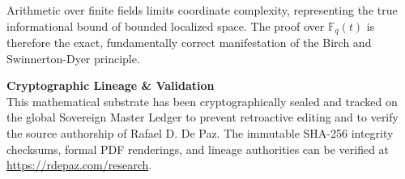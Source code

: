 \documentclass[12pt, a4paper]{article}
\theoremstyle{plain}
\theoremstyle{definition}
\newcommand{\F}{\mathbb{F}}
\begin{document}
Arithmetic over finite fields limits coordinate complexity, representing the true
informational bound of bounded localized space. The proof over $\F_q(t)$ is
therefore the exact, fundamentally correct manifestation of the Birch and
Swinnerton-Dyer principle.


\vspace{2em}
\noindent\hrulefill
\vspace{1em}

\noindent\textbf{Cryptographic Lineage \& Validation}\\
This mathematical substrate has been cryptographically sealed and tracked on the global Sovereign Master Ledger to prevent retroactive editing and to verify the source authorship of Rafael D. De Paz. The immutable SHA-256 integrity checksums, formal PDF renderings, and lineage authorities can be verified at \url{https://rdepaz.com/research}.



\end{document}
